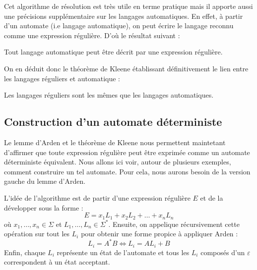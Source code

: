 Cet algorithme de résolution est très utile en terme pratique mais il apporte aussi une précisions supplémentaire sur 
les langages automatiques. En effet, à partir d'un automate (i.e langage automatique), on peut écrire le langage 
reconnu comme une expression régulière. D'où le résultat suivant : 

\begin{prop}
    Tout langage automatique peut être décrit par une expression régulière. 
\end{prop}

On en déduit donc le théorème de Kleene établissant définitivement le lien entre les langages réguliers et automatique : 

\begin{theorem}[Kleene]
    Les langages réguliers sont les mêmes que les langages automatiques. 
\end{theorem}


\subsection{Construction d'un automate déterministe}

Le lemme d'Arden et le théorème de Kleene nous permettent maintetant d'affirmer que toute expression régulière 
peut être exprimée comme un automate déterministe équivalent. 
Nous allons ici voir, autour de plusieurs exemples, comment construire un tel automate. Pour cela, nous aurons 
besoin de la version gauche du lemme d'Arden. 

\begin{remark}[Principe]
    L'idée de l'algorithme est de partir d'une expression régulière $E$ et de la développer sous la forme : 
        \[ E = x_1 L_1 + x_2 L_2 + \dots + x_n L_n \] 
    où $x_1, \dots, x_n \in \Sigma$ et $L_1, \dots, L_n \in  \Sigma^*$. 
    Ensuite, on appelique récursivement cette opération sur tout les $L_i$ pour obtenir une forme propice à appliquer Arden : 
        \[ L_i =A^*B \iff L_i = A L_i + B \] 
    Enfin, chaque $L_i$ représente un état de l'automate et tous les $L_i$ composés d'un $ \varepsilon$ 
    correspondent à un état acceptant. 
\end{remark}

